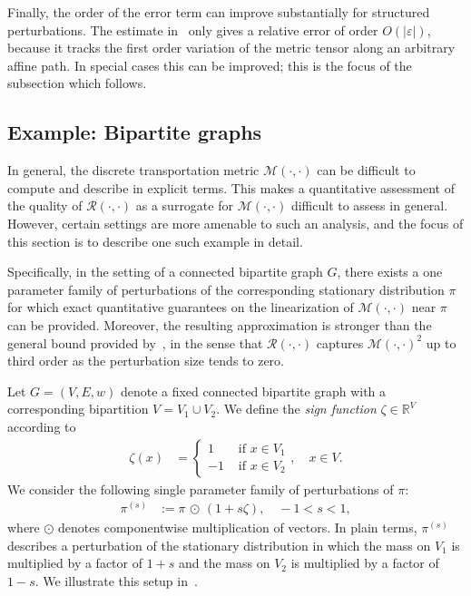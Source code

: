 \documentclass[11pt,a4paper]{article}
\newcommand{\Maas}{\mathcal{M}}
\newcommand{\Resis}{\mathcal{R}}
\begin{document}
Finally, the order of the error term can improve substantially for structured perturbations. The estimate in~ only gives a relative error of order $O(|\varepsilon|)$, because it tracks the first order variation of the metric tensor along an arbitrary affine path. In special cases this can be improved; this is the focus of the subsection which follows.

\subsection{Example: Bipartite graphs}\label{subsec:bipartite}

In general, the discrete transportation metric $\Maas(\cdot,\cdot)$ can be difficult to compute and describe in explicit terms. This makes a quantitative assessment of the quality of $\Resis(\cdot,\cdot)$ as a surrogate for $\Maas(\cdot,\cdot)$ difficult to assess in general. However, certain settings are more amenable to such an analysis, and the focus of this section is to describe one such example in detail.

Specifically, in the setting of a connected bipartite graph $G$, there exists a one parameter family of perturbations of the corresponding stationary distribution $\pi$ for which exact quantitative guarantees on the linearization of $\Maas(\cdot,\cdot)$ near $\pi$ can be provided. Moreover, the resulting approximation is stronger than the general bound provided by~, in the sense that $\Resis(\cdot,\cdot)$ captures $\Maas(\cdot,\cdot)^2$ up to third order as the perturbation size tends to zero. 

Let $G=(V,E,w)$ denote a fixed connected bipartite graph with a corresponding bipartition $V=V_1\cup V_2$. We define the \emph{sign function} $\zeta\in\mathbb{R}^{V}$ according to
    \begin{align*}
        \zeta(x) &= \begin{cases}
            1&\text{ if }x\in V_1\\
            -1&\text{ if }x\in V_2
        \end{cases},\quad x\in V.
    \end{align*}
We consider the following single parameter family of perturbations of $\pi$:
    \begin{align}\label{eq:bipartite-perturbation}
        \pi^{(s)} &:= \pi\,\odot\,(1+s\zeta),\quad -1<s<1,
    \end{align}
where $\odot$ denotes componentwise multiplication of vectors. In plain terms, $\pi^{(s)}$ describes a perturbation of the stationary distribution in which the mass on $V_1$ is multiplied by a factor of $1+s$ and the mass on $V_2$ is multiplied by a factor of $1-s$. We illustrate this setup in~.
\end{document}
